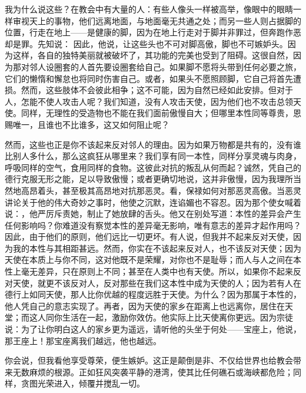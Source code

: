 我为什么说这些？在教会中有大量的人：有些人像头一样被高举，像眼中的眼睛一样审视天上的事物，他们远离地面，与地面毫无共通之处；而另一些人则占据脚的位置，行走在地上——是健康的脚，因为在地上行走对于脚并非罪过，但奔跑作恶却是罪。先知说： 因此，他说，让这些头也不可对脚高傲，脚也不可嫉妒头。因为这样，各自的独特美丽就被破坏了，其功能的完美也受到了阻碍。这很自然，因为那对邻人设圈套的人首先要设圈套给自己。如果脚不愿将头带到任何必要之旅，它们的懒惰和懈怠也将同时伤害自己。或者，如果头不愿照顾脚，它自己将首先遭损。然而，这些肢体不会彼此相争；这不可能，因为自然已经如此安排。但对于人，怎能不使人攻击人呢？我们知道，没有人攻击天使，因为他们也不攻击总领天使。同样，无理性的受造物也不能在我们面前傲慢自大；但哪里本性同等尊贵，恩赐唯一，且谁也不比谁多，这又如何阻止呢？\par

然而，这些也正是你不该起来反对邻人的理由。因为如果万物都是共有的，没有谁比别人多什么，那么这疯狂从哪里来？我们享有同一本性，同样分享灵魂与肉身，呼吸同样的空气，食用同样的食物。这彼此对抗的叛乱从何而起？\newline{}诚然，凭自己的德行克服无形之能，足以导致傲慢；或者更确切地说，这并非傲慢，因为我理所当然地高昂着头，甚至极其高昂地对抗那恶灵。看，保禄如何对那恶灵高傲。当恶灵讲论关于他的伟大奇妙之事时，他使之沉默，连谄媚也不容忍。因为那个使女喊着说：，他严厉斥责她，制止了她放肆的舌头。他又在别处写道：\newline{}本性的差异会产生任何影响吗？你难道没有察觉本性的差异毫无影响，唯有意志的差异才起作用吗？因此，由于他们的原则，他们远比一切更坏。\newline{}有人说，但我并不起来反对天使，因为我的本性与其相距甚远。然而，你实在不该起来反对人，也不该反对天使；因为天使在本质上与你不同，这对他既不是荣耀，对你也不是耻辱；而人与人之间在本性上毫无差异，只在原则上不同；甚至在人类中也有天使。所以，如果你不起来反对天使，就更不该反对人，反对那些在我们这本性中成为天使的人；因为若有人在德行上如同天使，那人比你优越的程度远胜于天使。为什么？因为那属于本性的，他人凭自己的意志实现了。再者，因为天使的家乡在距离上也远离你，居住在天堂；而这人同你生活在一起，激励你效仿。他实际上比天使离你更远。因为宗徒说：为了让你明白这人的家乡更为遥远，请听他的头坐于何处——宝座上，他说，那王座上！那宝座离我们越远，他也越远。\par

你会说，但我看他享受尊荣，便生嫉妒。这正是颠倒是非、不仅给世界也给教会带来无数麻烦的根源。正如狂风突袭平静的港湾，使其比任何礁石或海峡都危险；同样，贪图光荣进入，倾覆并搅乱一切。\par

